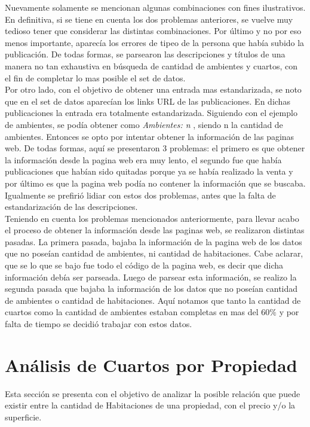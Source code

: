 \documentclass[a4paper, 10pt]{article}
\begin{document}
		Nuevamente solamente se mencionan algunas combinaciones con fines ilustrativos. En definitiva, si se tiene en cuenta los dos problemas anteriores, se vuelve muy tedioso tener que considerar las distintas combinaciones. Por último y no por eso menos importante, aparecía los errores de tipeo de la persona que había subido la publicación. De todas formas, se parsearon las descripciones y títulos de una manera no tan exhaustiva en búsqueda de cantidad de ambientes y cuartos, con el fin de completar lo mas posible el set de datos.
		\\
		Por otro lado, con el objetivo de obtener una entrada mas estandarizada, se noto que en el set de datos aparecían los links URL de las publicaciones. En dichas publicaciones la entrada era totalmente estandarizada. Siguiendo con el ejemplo de ambientes, se podía obtener como \emph{Ambientes: n }, siendo n la cantidad de ambientes. Entonces se opto por intentar obtener la información de las paginas web. De todas formas, aquí se presentaron 3 problemas: el primero es que obtener la información desde la pagina web era muy lento, el segundo fue que había publicaciones que habían sido quitadas porque ya se había realizado la venta y por último es que la pagina web podía no contener la información que se buscaba. Igualmente se prefirió lidiar con estos dos problemas, antes que la falta de estandarización de las descripciones.
		\\
		Teniendo en cuenta los problemas mencionados anteriormente, para llevar acabo el proceso de obtener la información desde las paginas web, se realizaron distintas pasadas. La primera pasada, bajaba la información de la pagina web de los datos que no poseían cantidad de ambientes, ni cantidad de habitaciones. Cabe aclarar, que se lo que se bajo fue todo el código de la pagina web, es decir que dicha información debía ser parseada. Luego de parsear esta información, se realizo la segunda pasada que bajaba la información de los datos que no poseían cantidad de ambientes o cantidad de habitaciones. Aquí notamos que tanto la cantidad de cuartos como la cantidad de ambientes estaban completas en mas del 60$\%$ y por falta de tiempo se decidió trabajar con estos datos.
		
		\section{Análisis de Cuartos por Propiedad}
		
			Esta sección se presenta con el objetivo de analizar la posible relación que puede existir entre la cantidad de Habitaciones de una propiedad, con el precio y/o la superficie. 				
\end{document}
